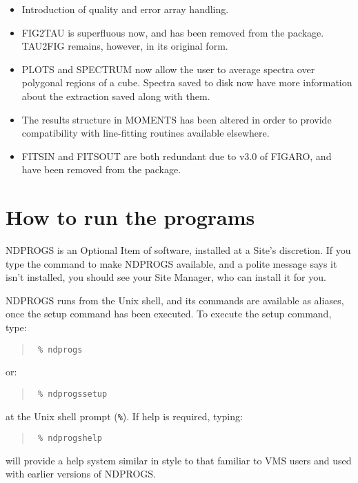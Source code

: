 \begin{itemize}

\item Introduction of quality and error array handling.

\item FIG2TAU is superfluous now, and has been removed from the
package.  TAU2FIG remains, however, in its original form.

\item PLOTS and SPECTRUM now allow the user to average spectra over
polygonal regions of a cube. Spectra saved to disk now have more
information about the extraction saved along with them.

\item The results structure in MOMENTS has been altered in order to
provide compatibility with line-fitting routines available elsewhere.

\item FITSIN and FITSOUT are both redundant due to v3.0 of FIGARO, and
have been removed from the package.

\end{itemize}

\section{How to run the programs{}}
\label{sec:run}

NDPROGS is an Optional Item of software, installed at a
Site's discretion. If you type the command to make NDPROGS available, and
a polite message says it isn't installed, you should see your Site
Manager, who can install it for you.

NDPROGS runs from the Unix shell, and its commands are available as
aliases, once the setup command has been executed.  To execute the
setup command, type:

\begin{quote}\tt
\% ndprogs
\end{quote}

or:

\begin{quote}\tt
\% ndprogssetup
\end{quote}

at the Unix shell prompt ({\tt \%}). If help is required, typing:

\begin{quote}\tt
\% ndprogshelp
\end{quote}

will provide a help system similar in style to that familiar to 
VMS users and used with earlier versions of NDPROGS.

